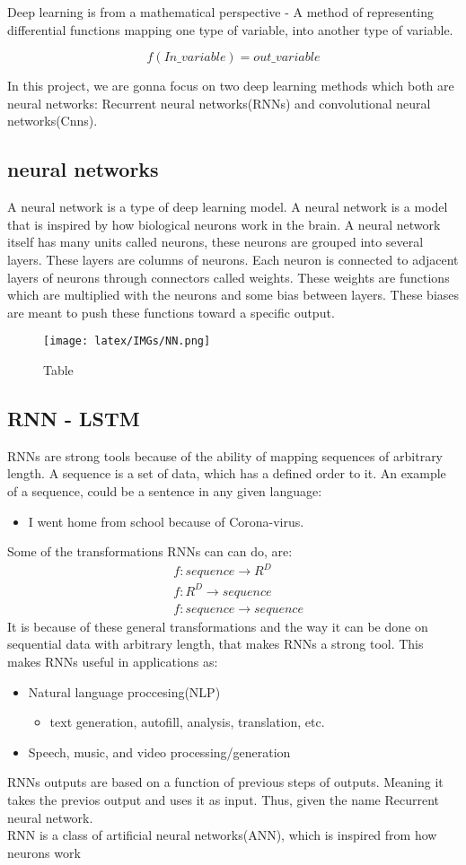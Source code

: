 Deep learning is from a mathematical perspective - A method of representing differential functions mapping one type of variable, into another type of variable.

$$
f(In\_variable) = out\_variable
$$

\noindent
In this project, we are gonna focus on two deep learning methods which both are neural networks: Recurrent neural networks(RNNs) and convolutional neural networks(Cnns).

\subsection{neural networks}
A neural network is a type of deep learning model. A neural network is a model that is inspired by how biological neurons work in the brain. A neural network itself has many units called neurons, these neurons are grouped into several layers. These layers are columns of neurons. Each neuron is connected to adjacent layers of neurons through connectors called weights. These weights are functions which are multiplied with the neurons and some bias between layers. These biases are meant to push these functions toward a specific output.

\begin{figure}[!ht]
  \centering
  \texttt{[image: latex/IMGs/NN.png]}
  \caption{Table}\label{Baseline:before}
\end{figure}

\subsection{RNN - LSTM}
RNNs are strong tools because of the ability of mapping sequences of arbitrary length. A sequence is a set of data, which has a defined order to it. An example of a sequence, could be a sentence in any given language:
\begin{itemize}
    \item I went home from school because of Corona-virus.
\end{itemize}

\noindent
Some of the transformations RNNs can can do, are:
\begin{align*}
	&f:sequence \rightarrow R^D\\
	&f:R^D \rightarrow sequence\\
	&f:sequence \rightarrow sequence
\end{align*}
\noindent
It is because of these general transformations and the way it can be done on sequential data with arbitrary length, that makes RNNs a strong tool. This makes RNNs useful in applications as:
\begin{itemize}
    \item Natural language proccesing(NLP)
    \begin{itemize}
    	\item text generation, autofill, analysis, translation, etc.
    \end{itemize}
    \item Speech, music, and video processing/generation
\end{itemize}

\noindent
RNNs outputs are based on a function of previous steps of outputs. Meaning it takes the previos output and uses it as input. Thus, given the name Recurrent neural network.\\

\noindent
RNN is a class of artificial neural networks(ANN), which is inspired from how neurons work
